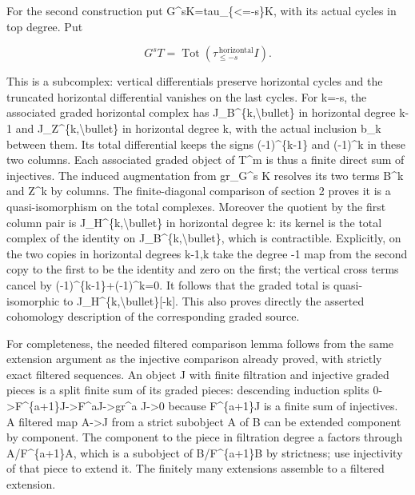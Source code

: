 For the second construction put G\textasciicircum{}sK\allowbreak{}=tau\_\allowbreak{}\{<\allowbreak{}=-s\}K,\allowbreak{} with its actual cycles in top degree. Put

\[
 G^sT=\operatorname{Tot}(\tau_{\le -s}^{\,\mathrm{horizontal}} I).
                                                                    \tag{3.1}
\]

This is a subcomplex:\allowbreak{} vertical differentials preserve horizontal cycles and the truncated horizontal differential vanishes on the last cycles. For k\allowbreak{}=-s,\allowbreak{} the associated graded horizontal complex has J\_\allowbreak{}B\textasciicircum{}\{k,\allowbreak{}\textbackslash{}bullet\} in horizontal degree k-1 and J\_\allowbreak{}Z\textasciicircum{}\{k,\allowbreak{}\textbackslash{}bullet\} in horizontal degree k,\allowbreak{} with the actual inclusion b\_\allowbreak{}k between them. Its total differential keeps the signs (-1)\allowbreak{}\textasciicircum{}\{k-1\} and (-1)\allowbreak{}\textasciicircum{}k in these two columns. Each associated graded object of T\^{}m is thus a finite direct sum of injectives. The induced augmentation from gr\_\allowbreak{}G\textasciicircum{}s K resolves its two terms B\^{}k and Z\^{}k by columns. The finite-diagonal comparison of section 2 proves it is a quasi-isomorphism on the total complexes. Moreover the quotient by the first column pair is J\_\allowbreak{}H\textasciicircum{}\{k,\allowbreak{}\textbackslash{}bullet\} in horizontal degree k:\allowbreak{} its kernel is the total complex of the identity on J\_\allowbreak{}B\textasciicircum{}\{k,\allowbreak{}\textbackslash{}bullet\},\allowbreak{} which is contractible. Explicitly,\allowbreak{} on the two copies in horizontal degrees k-1,\allowbreak{}k take the degree -1 map from the second copy to the first to be the identity and zero on the first; the vertical cross terms cancel by (-1)\allowbreak{}\textasciicircum{}\{k-1\}\allowbreak{}+(-1)\allowbreak{}\textasciicircum{}k\allowbreak{}=0. It follows that the graded total is quasi-isomorphic to J\_\allowbreak{}H\textasciicircum{}\{k,\allowbreak{}\textbackslash{}bullet\}[-k]\allowbreak{}. This also proves directly the asserted cohomology description of the corresponding graded source.

For completeness,\allowbreak{} the needed filtered comparison lemma follows from the same extension argument as the injective comparison already proved,\allowbreak{} with strictly exact filtered sequences. An object J with finite filtration and injective graded pieces is a split finite sum of its graded pieces:\allowbreak{} descending induction splits 0\allowbreak{}->F\textasciicircum{}\{a\allowbreak{}+1\}J\allowbreak{}->F\textasciicircum{}aJ\allowbreak{}->gr\textasciicircum{}a J\allowbreak{}->0 because F\textasciicircum{}\{a\allowbreak{}+1\}J is a finite sum of injectives. A filtered map A\allowbreak{}->J from a strict subobject A of B can be extended component by component. The component to the piece in filtration degree a factors through A/\allowbreak{}F\textasciicircum{}\{a\allowbreak{}+1\}A,\allowbreak{} which is a subobject of B/\allowbreak{}F\textasciicircum{}\{a\allowbreak{}+1\}B by strictness; use injectivity of that piece to extend it. The finitely many extensions assemble to a filtered extension.

